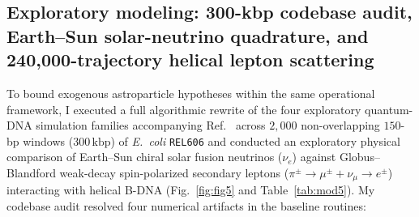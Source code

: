 \documentclass[10pt,letterpaper]{article}
\theoremstyle{plain}
\theoremstyle{definition}
\begin{document}
\subsection*{Exploratory modeling: 300-kbp codebase audit, Earth--Sun solar-neutrino quadrature, and 240,000-trajectory helical lepton scattering}

To bound exogenous astroparticle hypotheses within the same operational framework, I executed a full algorithmic rewrite of the four exploratory quantum-DNA simulation families accompanying Ref.~\cite{garcia2026dna} across $2{,}000$ non-overlapping $150$-bp windows ($300\,\mathrm{kbp}$) of \emph{E.\ coli} \texttt{REL606} and conducted an exploratory physical comparison of Earth--Sun chiral solar fusion neutrinos ($\nu_e$) against Globus--Blandford weak-decay spin-polarized secondary leptons ($\pi^\pm \to \mu^\pm + \nu_\mu \to e^\pm$) \cite{globus2020apjl,globus2021apj,globus2021muons,appel2022borexino} interacting with helical B-DNA (Fig.~\ref{fig:fig5} and Table~\ref{tab:mod5}). My codebase audit resolved four numerical artifacts in the baseline routines:
\end{document}
